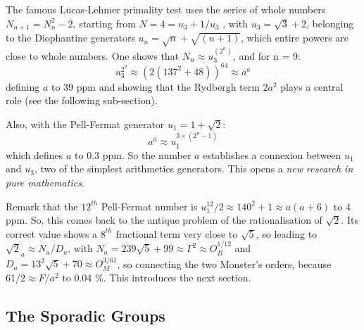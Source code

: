 \documentclass[twoside,draft]{article}
\begin{document}
\begin{sloppypar}
{The famous Lucas-Lehmer primality test uses the series of whole numbers $N_{n+1} = N_{n}^{2}-2$,
starting from $N = 4 = u_{3} + 1/u_{3}$ , with $u_{3} = \sqrt{3} + 2$, belonging to the Diophantine generators $u_{n} = \sqrt{n} + \sqrt{(n+1)}$, which entire powers are close to whole numbers. One shows that $N_{n} \approx u_{3}^{(2^{n})}$, and for n = 9:
\begin{equation}
u_{3}^{2^9} \approx (2(137^{2} + 48))^{64} \approx a^{a}
\end{equation}
defining $a$ to 39 ppm and showing that the Rydbergh term $2a^2$ plays a central role (see the following sub-section).

Also, with the Pell-Fermat generator $u_{1} = 1 + \sqrt{2}$:
\begin{equation}
a^{a} \approx u_1^{3\times(2^{8}-1)}
\end{equation}
which defines $a$ to 0.3 ppm. So the number $a$ establishes a connexion between $u_{1}$ and $u_{3}$, two of the
simplest arithmetics generators. This opens a \textit{new research in pure mathematics}.

Remark that the $12^{th}$ Pell-Fermat number is $ u_1^{12}/2 \approx 140^2 + 1 \approx a(a+6)$ to 4 ppm. So, this comes back to the antique problem of the rationalisation of $\sqrt{2}$. Its correct value shows a $8^{th}$ fractional term very close to $\sqrt{5}$, so leading to $\sqrt{2}_a \approx N_{a}/D_{a}$, with $ N_{a} = 239 \sqrt{5} + 99 \approx \Gamma^{2}
\approx O_B^{1/12} $ and $ D_{a} = 13^2 \sqrt{5} + 70 \approx O_M^{3/61}$,
so connecting the two Monster's orders, because $61/2 \approx F/a^{2}$ to 0.04 \%.
This introduces the next section.

\subsection{The Sporadic Groups}

}
\end{sloppypar}
\end{document}
